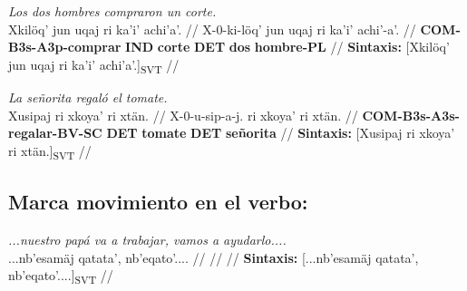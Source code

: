 \documentclass{article}%
\begin{document}
%
\par\medskip%
\ex
\textit{Los dos hombres compraron un corte.} \\
\begingl
\gla Xkilöq' jun uqaj ri ka'i' achi'a'. //
\glb X-0-ki-löq' jun uqaj ri ka'i' achi'-a'. //
\glc \textbf{COM-}\textbf{B3s-}\textbf{A3p-}\textbf{comprar} \textbf{IND} \textbf{corte} \textbf{DET} \textbf{dos} \textbf{hombre-}\textbf{PL} //
\glft \textbf{Sintaxis:} [Xkilöq' jun uqaj ri ka'i' achi'a'.]\textsubscript{SVT} //
\endgl
\xe
%
\medskip%
\par\medskip%
\ex
\textit{La señorita regaló el tomate.} \\
\begingl
\gla Xusipaj ri xkoya' ri xtän. //
\glb X-0-u-sip-a-j. ri xkoya' ri xtän. //
\glc \textbf{COM-}\textbf{B3s-}\textbf{A3s-}\textbf{regalar-}\textbf{BV-}\textbf{SC} \textbf{DET} \textbf{tomate} \textbf{DET} \textbf{señorita} //
\glft \textbf{Sintaxis:} [Xusipaj ri xkoya' ri xtän.]\textsubscript{SVT} //
\endgl
\xe
%
\medskip%
\subsection{Marca movimiento en el verbo:}%
\label{subsec:Marcamovimientoenelverbo}%

%
\par\medskip%
\ex
\textit{...nuestro papá va a trabajar, vamos a ayudarlo....} \\
\begingl
\gla ...nb'esamäj qatata', nb'eqato'.... //
\glb  //
\glc  //
\glft \textbf{Sintaxis:} [...nb'esamäj qatata', nb'eqato'....]\textsubscript{SVT} //
\endgl
\xe
%
\medskip

%
\end{document}

